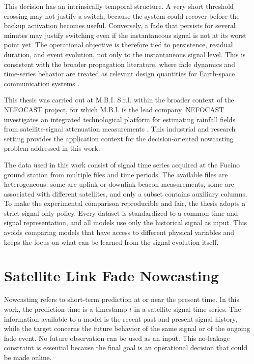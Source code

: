 This decision has an intrinsically temporal structure. A very short threshold
crossing may not justify a switch, because the system could recover before the
backup activation becomes useful. Conversely, a fade that persists for several
minutes may justify switching even if the instantaneous signal is not at its
worst point yet. The operational objective is therefore tied to persistence,
residual duration, and event evolution, not only to the instantaneous signal
level. This is consistent with the broader propagation literature, where fade
dynamics and time-series behavior are treated as relevant design quantities
for Earth-space communication systems \cite{iturP1623,iturP1853}.

This thesis was carried out at M.B.I. S.r.l. \cite{mbiGroup} within the broader
context of the NEFOCAST project, for which M.B.I. is the lead company. NEFOCAST
investigates an integrated technological platform for estimating rainfall
fields from satellite-signal attenuation measurements
\cite{nefocastProject}. This industrial and research setting provides the
application context for the
decision-oriented nowcasting problem addressed in this work.

The data used in this work consist of signal time series acquired at the
Fucino ground station from multiple files and time periods. The available files
are heterogeneous: some are uplink or downlink beacon measurements, some are
associated with different satellites, and only a subset contains auxiliary
columns. To make the experimental comparison reproducible and fair, the thesis
adopts a strict signal-only policy. Every dataset is standardized to a common
time and signal representation, and all models use only the historical signal
as input. This avoids comparing models that have access to different physical
variables and keeps the focus on what can be learned from the signal evolution
itself.

\section{Satellite Link Fade Nowcasting}
\label{sec:introduction-nowcasting-problem}

Nowcasting refers to short-term prediction at or near the present time. In this
work, the prediction time is a timestamp \(t\) in a satellite signal time
series. The information available to a model is the recent past and present
signal history, while the target concerns the future behavior of the same
signal or of the ongoing fade event. No future observation can be used as an
input. This no-leakage constraint is essential because the final goal is an
operational decision that could be made online.

